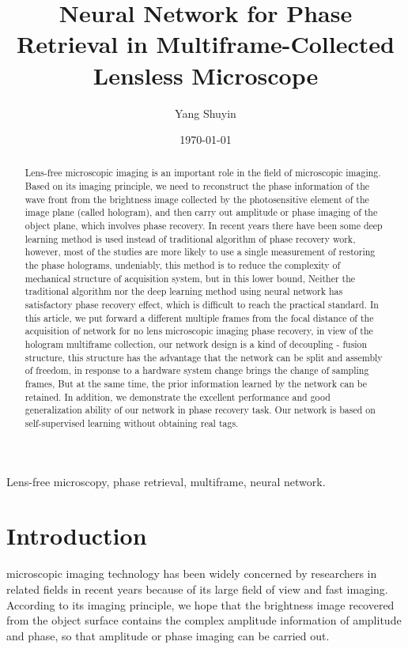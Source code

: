 \documentclass[lettersize,journal]{IEEEtran}
\title{Neural Network for Phase Retrieval in Multiframe-Collected Lensless Microscope}
\author{Yang Shuyin}
\date{\today}
\begin{document}
	\maketitle

	\begin{abstract}
		Lens-free microscopic imaging is an important role in the field of microscopic imaging. Based on its imaging principle, we need to reconstruct the phase information of the wave front from the brightness image collected by the photosensitive element of the image plane (called hologram), and then carry out amplitude or phase imaging of the object plane, which involves phase recovery. In recent years there have been some deep learning method is used instead of traditional algorithm of phase recovery work, however, most of the studies are more likely to use a single measurement of restoring the phase holograms, undeniably, this method is to reduce the complexity of mechanical structure of acquisition system, but in this lower bound, Neither the traditional algorithm nor the deep learning method using neural network has satisfactory phase recovery effect, which is difficult to reach the practical standard. In this article, we put forward a different multiple frames from the focal distance of the acquisition of network for no lens microscopic imaging phase recovery, in view of the hologram multiframe collection, our network design is a kind of decoupling - fusion structure, this structure has the advantage that the network can be split and assembly of freedom, in response to a hardware system change brings the change of sampling frames, But at the same time, the prior information learned by the network can be retained. In addition, we demonstrate the excellent performance and good generalization ability of our network in phase recovery task. Our network is based on self-supervised learning without obtaining real tags. 
	\end{abstract}

	\begin{IEEEkeywords}
		Lens-free microscopy, phase retrieval, multiframe, neural network.
	\end{IEEEkeywords}

	\section{Introduction}
	 microscopic imaging technology has been widely concerned by researchers in related fields in recent years because of its large field of view and fast imaging. According to its imaging principle, we hope that the brightness image recovered from the object surface contains the complex amplitude information of amplitude and phase, so that amplitude or phase imaging can be carried out.\cite{zhang2008recommendation}
\end{document}
